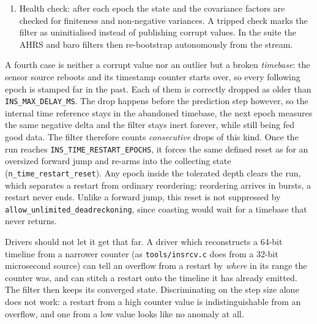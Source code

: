 \documentclass[11pt,a4paper]{article}
\newcommand{\code}[1]{\texttt{#1}}
\begin{document}
\begin{enumerate}
        skipped. A skip policy would deadlock when a persistent offset exceeds
        an optimistic prior (the measurement is rejected forever while the
        covariance never shrinks). \emph{High-rate local references}
        (lighthouse, UWB, mocap) are \emph{skipped} on outliers. They glitch
        (occlusion, reflections) and a dropped sample is cheap at their rate.
  \item Health check: after each epoch the state and the covariance factors are
        checked for finiteness and non-negative variances. A tripped check marks
        the filter as uninitialised instead of publishing corrupt values. In the
        suite the AHRS and baro filters then re-bootstrap autonomously from the
        stream.
\end{enumerate}

A fourth case is neither a corrupt value nor an outlier but a broken
\emph{timebase}: the sensor source reboots and its timestamp counter starts
over, so every following epoch is stamped far in the past. Each of them is
correctly dropped as older than
\code{INS\_\allowbreak{}MAX\_\allowbreak{}DELAY\_\allowbreak{}MS}. The drop
happens before the prediction step however, so the internal time reference stays
in the abandoned timebase, the next epoch measures the same negative delta and
the filter stays inert forever, while still being fed good data. The filter
therefore counts \emph{consecutive} drops of this kind. Once the run reaches
\code{INS\_\allowbreak{}TIME\_\allowbreak{}RESTART\_\allowbreak{}EPOCHS}, it
forces the same defined reset as for an oversized forward jump and re-arms into
the collecting state
(\code{n\_\allowbreak{}time\_\allowbreak{}restart\_\allowbreak{}reset}). Any
epoch inside the tolerated depth clears the run, which separates a restart from
ordinary reordering: reordering arrives in bursts, a restart never ends. Unlike
a forward jump, this reset is not suppressed by
\code{allow\_\allowbreak{}unlimited\_\allowbreak{}deadreckoning}, since
coasting would wait for a timebase that never returns.

Drivers should not let it get that far. A driver which reconstructs a 64-bit
timeline from a narrower counter (as \code{tools/insrcv.c} does from a 32-bit
microsecond source) can tell an overflow from a restart by \emph{where} in its
range the counter was, and can stitch a restart onto the timeline it has already
emitted. The filter then keeps its converged state. Discriminating on the step
size alone does not work: a restart from a high counter value is
indistinguishable from an overflow, and one from a low value looks like no
anomaly at all.
\end{document}

